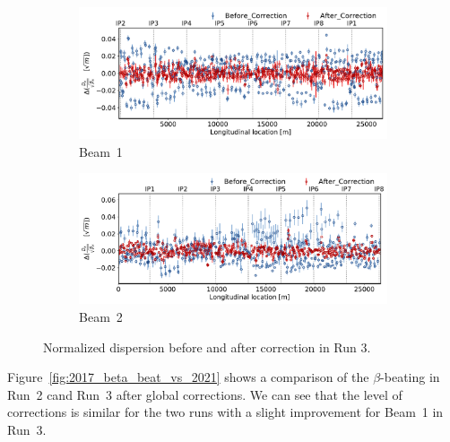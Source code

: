 \documentclass[a4paper]{cernatsnote}
\begin{document}
\begin{figure}[ht]
\begin{subfigure}{.5\textwidth}
  \centering
  \includegraphics[width=.99\linewidth]{plots/beam1/Normalized_disp_before_vs_after_corection.pdf}  
  \caption{Beam~1}
\end{subfigure}
\begin{subfigure}{.5\textwidth}
  \centering
  \includegraphics[width=.99\linewidth]{plots/beam2/ndisp_before_after_correction.pdf}  
  \caption{Beam~2}
\end{subfigure}
\caption{Normalized dispersion before and after correction in Run 3.}
\label{fig:before_after_correction_ndisp}
\end{figure}


Figure~\ref{fig:2017_beta_beat_vs_2021} shows a comparison of the $\beta$-beating in Run~2 cand Run~3 after global corrections. We can see that the level of corrections is similar for the two runs with a slight improvement for Beam~1 in Run~3. 
\end{document}

